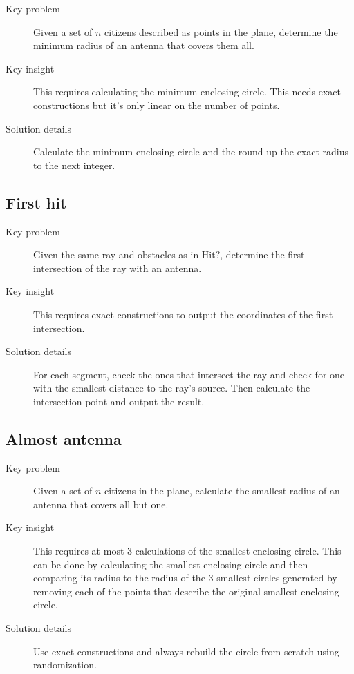 \documentclass[11pt]{book}
\begin{document}
\begin{description}
	\item[Key problem] Given a set of $n$ citizens described as points in the plane, determine the minimum radius of an antenna that covers them all.
	\item[Key insight] This requires calculating the minimum enclosing circle. This needs exact constructions but it's only linear on the number of points.
	\item[Solution details] Calculate the minimum enclosing circle and the round up the exact radius to the next integer.
\end{description}

\subsection{First hit}

\begin{description}
	\item[Key problem] Given the same ray and obstacles as in Hit?, determine the first intersection of the ray with an antenna.
	\item[Key insight] This requires exact constructions to output the coordinates of the first intersection.
	\item[Solution details] For each segment, check the ones that intersect the ray and check for one with the smallest distance to the ray's source. Then calculate the intersection point and output the result.
\end{description}

\subsection{Almost antenna}

\begin{description}
	\item[Key problem] Given a set of $n$ citizens in the plane, calculate the smallest radius of an antenna that covers all but one.
	\item[Key insight] This requires at most 3 calculations of the smallest enclosing circle. This can be done by calculating the smallest enclosing circle and then comparing its radius to the radius of the 3 smallest circles generated by removing each of the points that describe the original smallest enclosing circle.
	\item[Solution details] Use exact constructions and always rebuild the circle from scratch using randomization.
\end{description}
\end{document}
